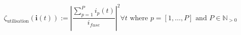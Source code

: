 \begin{equation}
	\zeta_\text{utilisation}(\textbf{i}(t)) :=%
	\left|\frac{\sum_{p=1}^{P}{i_p(t)}}{i_{fuse}}\right|^2 \forall t%
	\text{ where } p = [1, \dots, P]%
	\text{ and } P \in \mathbb{N}_{>0}
	\label{ch1:equ:fuse-utilisation}
\end{equation}